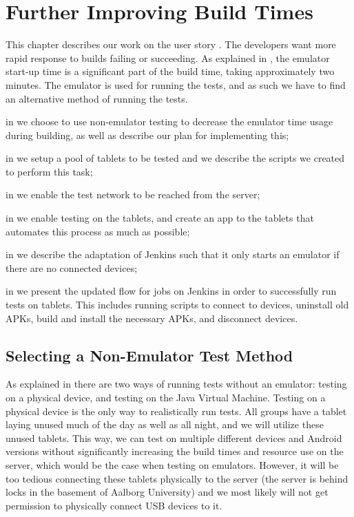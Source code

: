 \chapter{Further Improving Build Times}
This chapter describes our work on the user story . The developers want more rapid response to builds failing or succeeding. As explained in , the emulator start-up time is a significant part of the build time, taking approximately two minutes. The emulator is used for running the tests, and as such we have to find an alternative method of running the tests.

\begin{chapterorganization}
  \item in  we choose to use non-emulator testing to decrease the emulator time usage during building, as well as describe our plan for implementing this;
  \item in  we setup a pool of tablets to be tested and we describe the scripts we created to perform this task;
  \item in  we enable the test network to be reached from the server;
  \item in  we enable testing on the tablets, and create an app to the tablets that automates this process as much as possible;
  \item in  we describe the adaptation of Jenkins such that it only starts an emulator if there are no connected devices;
  \item in  we present the updated flow for jobs on Jenkins in order to successfully run tests on tablets. This includes running scripts to connect to devices, uninstall old APKs, build and install the necessary APKs, and disconnect devices.
\end{chapterorganization}

\section{Selecting a Non-Emulator Test Method}\label{sec:selecting_nonemu_method}
As explained in  there are two ways of running tests without an emulator: testing on a physical device, and testing on the Java Virtual Machine. Testing on a physical device is the only way to realistically run tests. All groups have a tablet laying unused much of the day as well as all night, and we will utilize these unused tablets. This way, we can test on multiple different devices and Android versions without significantly increasing the build times and resource use on the server, which would be the case when testing on emulators. However, it will be too tedious connecting these tablets physically to the server (the server is behind locks in the basement of Aalborg University) and we most likely will not get permission to physically connect USB devices to it.

